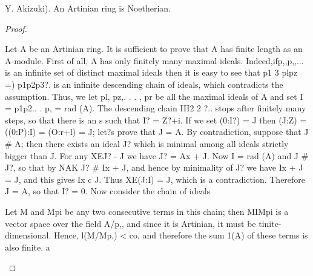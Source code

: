\begin{theorem}[Theorem 3.2]\label{mcrt-auto-theorem-3-2}\uses{}
\begin{mathematicalrecord}
Y. Akizuki). An Artinian ring is Noetherian.
\end{mathematicalrecord}
\end{theorem}
\begin{proof}
\begin{mathematicalrecord}
Let A be an Artinian ring. It is sufficient to prove that A has finite
length as an A-module. First of all, A has only finitely many maximal ideals.
Indeed,ifp,,p,,...     is an infinite set of distinct maximal ideals then it is easy
 to see that p1 3 plpz =) p1p2p3?. is an infinite descending chain of ideals,
 which contradicts the assumption. Thus, we let pl, pz,. . . , pr be all the
 maximal ideals of A and set I = p1p2.. . p, = rad (A). The descending chain
 III2    2 ?.. stops after finitely many steps, so that there is an s such that
 I? = Z?+i. If we set (0:I?) = J then
           (J:Z) = ((0:P):I) = (O:r+l) = J;
 let?s prove that J = A. By contradiction, suppose that J # A; then there exists
 an ideal J? which is minimal among all ideals strictly bigger than J. For any
 XEJ? - J we have J? = Ax + J. Now I = rad (A) and J # J?, so that by NAK
J? # Ix + J, and hence by minimality of J? we have Ix + J = J, and this gives
 Ix c J. Thus XE(J:I) = J, which is a contradiction. Therefore J = A, so that
 I? = 0. Now consider the chain of ideals



Let M and Mpi be any two consecutive terms in this chain; then MIMpi is a
vector space over the field A/p,, and since it is Artinian, it must be tinite-
dimensional. Hence, l(M/Mp,) < co, and therefore the sum 1(A) of these
terms is also finite. a
\end{mathematicalrecord}
\end{proof}


